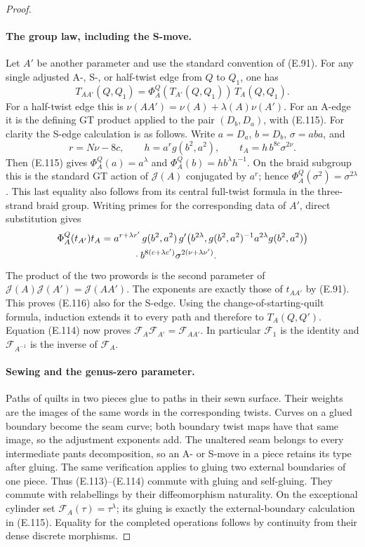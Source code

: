 \begin{proof}
\paragraph{The group law, including the S-move.}
Let $A'$ be another parameter and use the
standard convention of (E.91).
For any single adjusted A-, S-, or
half-twist edge from $Q$ to $Q_1$, one has
\[
 T_{AA'}(Q,Q_1)
       =\Phi_A^Q(T_{A'}(Q,Q_1))\,T_A(Q,Q_1).          \tag{E.116}
\]
For a half-twist edge this is
$\nu(AA')=\nu(A)+\lambda(A)\nu(A')$.
For an A-edge it is the defining GT
product applied to the pair $(D_b,D_a)$,
with (E.115).
For clarity the S-edge calculation is
as follows.  Write $a=D_a$, $b=D_b$,
$\sigma=aba$, and
\[
 r=N\nu-8c,\qquad
 h=a^r g(b^2,a^2),\qquad
 t_A=h\,b^{8c}\sigma^{2\nu}.
\]
Then (E.115) gives
$\Phi_A^Q(a)=a^\lambda$ and
$\Phi_A^Q(b)=hb^\lambda h^{-1}$.
On the braid subgroup this is the standard
GT action of $\mathcal J(A)$ conjugated
by $a^r$; hence
$\Phi_A^Q(\sigma^2)=\sigma^{2\lambda}$.
This last equality also follows from its
central full-twist formula in the
three-strand braid group.
Writing primes for the corresponding
data of $A'$, direct substitution gives
\[
\begin{split}
 \Phi_A^Q(t_{A'})t_A
  ={}&a^{r+\lambda r'}\,
       g(b^2,a^2)\,
       g'\bigl(b^{2\lambda},
          g(b^2,a^2)^{-1}a^{2\lambda}g(b^2,a^2)\bigr)\\
    &\hspace{7mm}\cdot b^{8(c+\lambda c')}
                  \sigma^{2(\nu+\lambda\nu')}.
\end{split}
\]
The product of the two prowords is the
second parameter of
$\mathcal J(A)\mathcal J(A')
=\mathcal J(AA')$.
The exponents are exactly those of
$t_{AA'}$ by (E.91).
This proves (E.116) also for the S-edge.
Using the change-of-starting-quilt formula,
induction extends it to every path and
therefore to $T_A(Q,Q')$.
Equation (E.114) now proves
$\mathcal F_A\mathcal F_{A'}=\mathcal F_{AA'}$.
In particular $\mathcal F_1$ is the identity
and $\mathcal F_{A^{-1}}$ is the inverse of
$\mathcal F_A$.

\paragraph{Sewing and the genus-zero parameter.}
Paths of quilts in two pieces glue to paths
in their sewn surface.  Their weights are
the images of the same words in the
corresponding twists.  Curves on a glued
boundary become the seam curve; both
boundary twist maps have that same image,
so the adjustment exponents add.
The unaltered seam belongs to every
intermediate pants decomposition, so
an A- or S-move in a piece retains its
type after gluing.  The same verification
applies to gluing two external boundaries
of one piece.  Thus (E.113)--(E.114)
commute with gluing and self-gluing.
They commute with relabellings by their
diffeomorphism naturality.  On the
exceptional cylinder set
$\mathcal F_A(\tau)=\tau^\lambda$;
its gluing is exactly the external-boundary
calculation in (E.115).
Equality for the completed operations
follows by continuity from their dense
discrete morphisms.


\end{proof}
